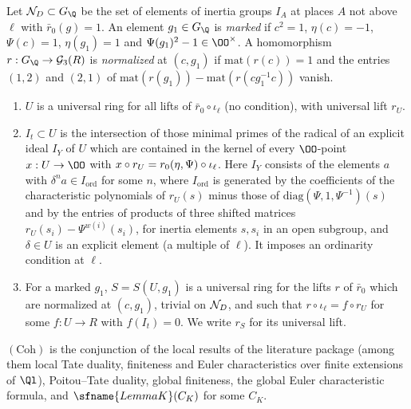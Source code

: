 Let $\eisKill_D\subset G_\Q$ be the set of elements of inertia groups $I_A$ at places $A$ not above $\ell$ with
$\bar r_0(g)=1$. An element $g_1\in G_\Q$ is \emph{marked} if $c^2=1$, $\eta(c)=-1$, $\Psi(c)=1$, $\eta(g_1)=1$ and
$\Psi(g_1)^2-1\in\OO^\times$. A homomorphism $r:G_\Q\to\eisGG(R)$ is \emph{normalized} at $(c,g_1)$ if $\mathrm{mat}(r(c))=1$
and the entries $(1,2)$ and $(2,1)$ of $\mathrm{mat}(r(g_1))-\mathrm{mat}(r(cg_1^{-1}c))$ vanish.

\begin{definition}\label{pf:eis:rings}
\leavevmode
\begin{enumerate}[label=(\alph*)]
\item $U$ is a universal ring for all lifts of $\bar r_0\circ\iota_\ell$ (no condition), with universal lift $r_U$.
\item $I_t\subset U$ is the intersection of those minimal primes of the radical of an explicit ideal $I_Y$ of $U$ which are
  contained in the kernel of every $\OO$-point $x:U\to\OO$ with $x\circ r_U=r_0(\eta,\Psi)\circ\iota_\ell$. Here $I_Y$ consists of
  the elements $a$ with $\delta^na\in I_{\mathrm{ord}}$ for some $n$, where $I_{\mathrm{ord}}$ is generated by the coefficients
  of the characteristic polynomials of $r_U(s)$ minus those of $\mathrm{diag}(\Psi,1,\Psi^{-1})(s)$ and by the entries of
  products of three shifted matrices $r_U(s_i)-\Psi^{w(i)}(s_i)$, for inertia elements $s,s_i$ in an open subgroup, and
  $\delta\in U$ is an explicit element (a multiple of $\ell$). It imposes an ordinarity condition at $\ell$.
\item For a marked $g_1$, $S=S(U,g_1)$ is a universal ring for the lifts $r$ of $\bar r_0$ which are normalized at
  $(c,g_1)$, trivial on $\mathcal N_D$, and such that $r\circ\iota_\ell=f\circ r_U$ for some $f:U\to R$ with $f(I_t)=0$. We write
  $r_S$ for its universal lift.
\end{enumerate}
\end{definition}

\begin{definition}\label{pf:eis:coh}
$(\mathrm{Coh})$ is the conjunction of the local results of the literature package (among them local Tate duality, finiteness
and Euler characteristics over finite extensions of $\Ql$), Poitou--Tate duality, global finiteness, the global Euler characteristic
formula, and $\sfname{LemmaK}(C_K)$ for some $C_K$.
\end{definition}

